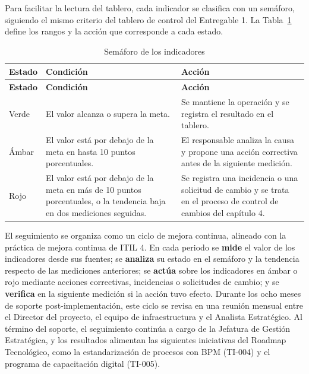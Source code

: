Para facilitar la lectura del tablero, cada indicador se clasifica con un semáforo, siguiendo el mismo criterio del tablero de control del Entregable 1. La Tabla~\ref{tab:cap5-6} define los rangos y la acción que corresponde a cada estado.


{\small
\renewcommand{\arraystretch}{1.3}
\begin{longtable}{|>{\raggedright\arraybackslash}p{0.71cm}|>{\raggedright\arraybackslash}p{7.14cm}|>{\raggedright\arraybackslash}p{7.14cm}|}
\caption{Semáforo de los indicadores}\label{tab:cap5-6}\\
\hline
\textbf{Estado} & \textbf{Condición} & \textbf{Acción} \\
\hline
\endfirsthead
\hline
\textbf{Estado} & \textbf{Condición} & \textbf{Acción} \\
\hline
\endhead
Verde & El valor alcanza o supera la meta. & Se mantiene la operación y se registra el resultado en el tablero. \\
\hline
Ámbar & El valor está por debajo de la meta en hasta 10 puntos porcentuales. & El responsable analiza la causa y propone una acción correctiva antes de la siguiente medición. \\
\hline
Rojo & El valor está por debajo de la meta en más de 10 puntos porcentuales, o la tendencia baja en dos mediciones seguidas. & Se registra una incidencia o una solicitud de cambio y se trata en el proceso de control de cambios del capítulo 4. \\
\hline
\end{longtable}
}


El seguimiento se organiza como un ciclo de mejora continua, alineado con la práctica de mejora continua de ITIL 4. En cada periodo se \textbf{mide} el valor de los indicadores desde sus fuentes; se \textbf{analiza} su estado en el semáforo y la tendencia respecto de las mediciones anteriores; se \textbf{actúa} sobre los indicadores en ámbar o rojo mediante acciones correctivas, incidencias o solicitudes de cambio; y se \textbf{verifica} en la siguiente medición si la acción tuvo efecto. Durante los ocho meses de soporte post-implementación, este ciclo se revisa en una reunión mensual entre el Director del proyecto, el equipo de infraestructura y el Analista Estratégico. Al término del soporte, el seguimiento continúa a cargo de la Jefatura de Gestión Estratégica, y los resultados alimentan las siguientes iniciativas del Roadmap Tecnológico, como la estandarización de procesos con BPM (TI-004) y el programa de capacitación digital (TI-005).
